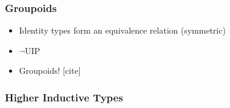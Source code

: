 \begin{frame}
\begin{itemize}
\begin{code}
\AgdaSpace{}%
\AgdaSymbol{)}\AgdaSpace{}%
\<%
\\
%
\>[4]\AgdaComment{-------------------------------------}\<%
\\
%
\>[4]\AgdaSymbol{(}\AgdaSpace{}%
\AgdaSymbol{:}\AgdaSpace{}%
\AgdaSymbol{)}\AgdaSpace{}%
\AgdaSpace{}%
\AgdaSymbol{(}\AgdaSpace{}%
\AgdaSymbol{:}\AgdaSpace{}%
\AgdaSpace{}%
\AgdaSpace{}%
\AgdaSymbol{)}\AgdaSpace{}%
\AgdaSpace{}%
\AgdaSpace{}%
\AgdaSpace{}%
\<%
\\
\>[0]\AgdaSpace{}%
\AgdaSpace{}%
\AgdaSpace{}%
\AgdaSpace{}%
\AgdaSpace{}%
\AgdaSymbol{=}\AgdaSpace{}%
\<%
\end{code}
\end{itemize}
\end{frame}

%

\begin{frame}
\frametitle{Groupoids}
\begin{itemize}
\item Identity types form an equivalence relation (symmetric)
\item $\neg$UIP
\item Groupoids! [cite]
\end{itemize}
\end{frame}

\begin{frame}
\frametitle{Higher Inductive Types}
\end{frame}
